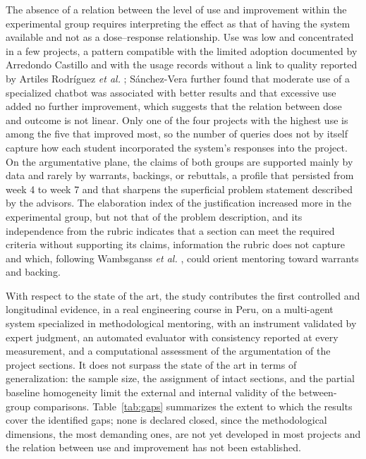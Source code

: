 \documentclass[journal]{IEEEtran}
\begin{document}
The absence of a relation between the level of use and improvement within the experimental group requires interpreting the effect as that of having the system available and not as a dose--response relationship. Use was low and concentrated in a few projects, a pattern compatible with the limited adoption documented by Arredondo Castillo \cite{arredondo2020} and with the usage records without a link to quality reported by Artiles Rodr\'iguez \emph{et al.} \cite{artiles2021}; S\'anchez-Vera \cite{sanchezvera2025} further found that moderate use of a specialized chatbot was associated with better results and that excessive use added no further improvement, which suggests that the relation between dose and outcome is not linear. Only one of the four projects with the highest use is among the five that improved most, so the number of queries does not by itself capture how each student incorporated the system's responses into the project. On the argumentative plane, the claims of both groups are supported mainly by data and rarely by warrants, backings, or rebuttals, a profile that persisted from week 4 to week 7 and that sharpens the superficial problem statement described by the advisors. The elaboration index of the justification increased more in the experimental group, but not that of the problem description, and its independence from the rubric indicates that a section can meet the required criteria without supporting its claims, information the rubric does not capture and which, following Wambsganss \emph{et al.} \cite{wambsganss2020}, could orient mentoring toward warrants and backing.

With respect to the state of the art, the study contributes the first controlled and longitudinal evidence, in a real engineering course in Peru, on a multi-agent system specialized in methodological mentoring, with an instrument validated by expert judgment, an automated evaluator with consistency reported at every measurement, and a computational assessment of the argumentation of the project sections. It does not surpass the state of the art in terms of generalization: the sample size, the assignment of intact sections, and the partial baseline homogeneity limit the external and internal validity of the between-group comparisons. Table~\ref{tab:gaps} summarizes the extent to which the results cover the identified gaps; none is declared closed, since the methodological dimensions, the most demanding ones, are not yet developed in most projects and the relation between use and improvement has not been established.
\end{document}
